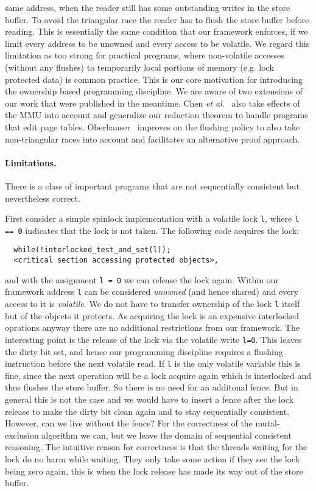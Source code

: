 \documentclass[11pt]{llncs}
\begin{document}
same address, when the reader still has some outstanding writes in the store buffer.
To avoid the triangular race the reader has to flush the store buffer before reading.
This is essentially the same condition that our framework enforces, if we limit
 every address to be unowned and every access to be volatile.
We regard this limitation as too strong for practical programs, where non-volatile accesses
(without any flushes) to temporarily local portions of memory (e.g. lock protected data) is common practice.
This is our core motivation for introducing the ownership based programming discipline.
%
We are aware of two extensions of our work that were published in the meantime.
Chen \textit{et al}.~\cite{chen-2014} also take effects of the MMU into account and generalize our reduction theorem to handle programs that edit page tables.
Oberhauser~\cite{Oberhauser-2016} improves on the flushing policy to also take non-triangular races into account and facilitates an alternative proof approach.


\paragraph{Limitations.}
There is a class of important programs that are not sequentially consistent but nevertheless correct.

First consider a simple spinlock implementation with a volatile lock \texttt{l}, where \texttt{l == 0}
indicates that the lock is not taken. The following code acquires the lock:
\begin{verbatim}
  while(!interlocked_test_and_set(l));
  <critical section accessing protected objects>,
\end{verbatim}
and with the assignment \texttt{l = 0} we can release the lock again.
Within our framework address \texttt{l} can be considered \emph{unowned} (and hence shared) and every access to it
is \emph{volatile}.
We do not have to transfer ownership of the lock \texttt{l} itself but of the objects it protects.
As acquiring the lock is an expensive interlocked oprations anyway there are no additional restrictions from our framework.
The interesting point is the release of the lock via the volatile write \texttt{l=0}.
This leaves the dirty bit set, and hence our programming discipline requires a flushing instruction before the
next volatile read.
If \texttt{l} is the only volatile variable this is fine, since the next operation will be a lock acquire again which is interlocked and thus flushes the store buffer.
So there is no need for an additonal fence.
But in general this is not the case and we would have to insert a fence after the lock release to make the dirty bit clean again and to stay sequentially consistent. However, can we live without the fence? For the correctness of the mutal-exclusion algorithm we can, but we leave the domain of sequential consistent reasoning.
The intuitive reason for correctness is that the threads waiting for the lock do no harm while waiting. They only take some action if they see the lock being zero again, this is when the lock release has made its way out of the store buffer.
\end{document}
